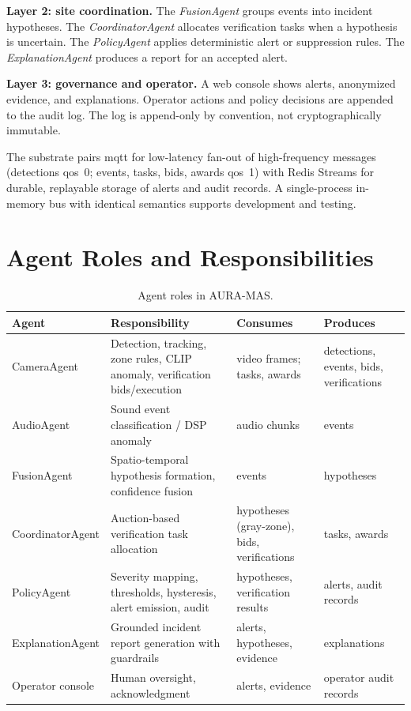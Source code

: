 \textbf{Layer 2: site coordination.} The \emph{FusionAgent} groups events into incident hypotheses. The \emph{CoordinatorAgent} allocates verification tasks when a hypothesis is uncertain. The \emph{PolicyAgent} applies deterministic alert or suppression rules. The \emph{ExplanationAgent} produces a report for an accepted alert.

\textbf{Layer 3: governance and operator.} A web console shows alerts, anonymized evidence, and explanations. Operator actions and policy decisions are appended to the audit log. The log is append-only by convention, not cryptographically immutable.

The substrate pairs \gls{mqtt} \cite{light2017mosquitto} for low-latency fan-out of high-frequency messages (detections \gls{qos}~0; events, tasks, bids, awards \gls{qos}~1) with Redis Streams for durable, replayable storage of alerts and audit records. A single-process in-memory bus with identical semantics supports development and testing.

\section{Agent Roles and Responsibilities}

\begin{table}[H]
\centering
\caption{Agent roles in AURA-MAS.}
\label{tab:agents}
\small
\begin{tabular}{p{2.8cm}p{4.6cm}p{2.6cm}p{2.6cm}}
\toprule
\textbf{Agent} & \textbf{Responsibility} & \textbf{Consumes} & \textbf{Produces} \\
\midrule
CameraAgent & Detection, tracking, zone rules, CLIP anomaly, verification bids/execution & video frames; tasks, awards & detections, events, bids, verifications \\
AudioAgent & Sound event classification / DSP anomaly & audio chunks & events \\
FusionAgent & Spatio-temporal hypothesis formation, confidence fusion & events & hypotheses \\
CoordinatorAgent & Auction-based verification task allocation & hypotheses (gray-zone), bids, verifications & tasks, awards \\
PolicyAgent & Severity mapping, thresholds, hysteresis, alert emission, audit & hypotheses, verification results & alerts, audit records \\
ExplanationAgent & Grounded incident report generation with guardrails & alerts, hypotheses, evidence & explanations \\
Operator console & Human oversight, acknowledgment & alerts, evidence & operator audit records \\
\bottomrule
\end{tabular}
\end{table}

